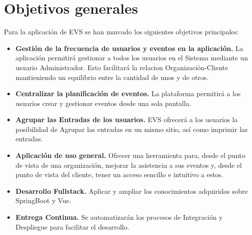 
\section{Objetivos generales}

Para la aplicación de EVS se han marcado los siguientes objetivos principales:
\begin{itemize}
    \item \textbf{Gestión de la frecuencia de usuarios y eventos en la aplicación.} La aplicación permitirá gestionar a todos los usuarios en el Sistema
    mediante un usuario Administrador. Esto facilitará la relacion Organización-Cliente mantieniendo un equilibrio entre la cantidad de unos y de otros.
    \item \textbf{Centralizar la planificación de eventos.} La plataforma permitirá a los usuarios crear y gestionar eventos desde una sola pantalla.
    \item \textbf{Agrupar las Entradas de los usuarios.}  EVS ofrecerá a los usuarios la posibilidad de Agrupar las entradas en un mismo sitio, así como imprimir las entradas.
    \item \textbf{Aplicación de uso general.} Ofrecer una herramienta para, desde el punto de vista de una organización, mejorar la asistencia a sus eventos
    y, desde el punto de vista del cliente, tener un acceso sencillo e intuitivo a estos.
    \item \textbf{Desarrollo Fullstack.} Aplicar y ampliar los conocimientos adquiridos sobre SpringBoot y Vue.
    \item \textbf{Entrega Continua.} Se automatizarán los procesos de Integración y Despliegue para facilitar el desarrollo.
    \end{itemize}
   

